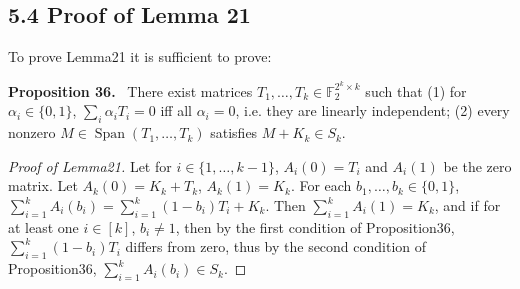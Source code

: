 \documentclass[10pt,a4paper]{article}
\newenvironment{authorclaim}[1]{\par\medskip\noindent\textbf{#1.}\ \ignorespaces}{\par\medskip}
\begin{document}
\subsection*{5.4 Proof of Lemma 21}
To prove Lemma21 it is sufficient to prove:
\begin{authorclaim}{Proposition 36}
There exist matrices $T_1,\ldots,T_k\in\mathbb F_2^{2^k\times k}$ such that (1) for $\alpha_i\in\{0,1\}$, $\sum_i\alpha_iT_i=0$ iff all $\alpha_i=0$, i.e. they are linearly independent; (2) every nonzero $M\in\operatorname{Span}(T_1,\ldots,T_k)$ satisfies $M+K_k\in S_k$.
\end{authorclaim}
\begin{proof}[Proof of Lemma21]
Let for $i\in\{1,\ldots,k-1\}$, $A_i(0)=T_i$ and $A_i(1)$ be the zero matrix. Let $A_k(0)=K_k+T_k$, $A_k(1)=K_k$. For each $b_1,\ldots,b_k\in\{0,1\}$, $\sum_{i=1}^kA_i(b_i)=\sum_{i=1}^k(1-b_i)T_i+K_k$. Then $\sum_{i=1}^kA_i(1)=K_k$, and if for at least one $i\in[k]$, $b_i\ne1$, then by the first condition of Proposition36, $\sum_{i=1}^k(1-b_i)T_i$ differs from zero, thus by the second condition of Proposition36, $\sum_{i=1}^kA_i(b_i)\in S_k$.
\end{proof}
\end{document}
